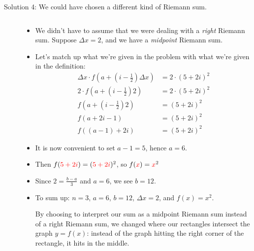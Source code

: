 \begin{solution}
\begin{description}
\item[Solution 4: We could have chosen a different kind of Riemann sum.]
$ $
\begin{itemize}
\item We didn't have to assume that we were dealing with a \emph{right} Riemann sum. Suppose $\Delta x =2$, and we have a \emph{midpoint} Riemann sum.

\item Let's match up what we're given in the problem with what we're given in the definition:
\begin{align*}
\Delta x \cdot f\left(a+\left(i-\tfrac{1}{2}\right)\Delta x\right)&=2\cdot\left(5+2i\right)^2\\
2 \cdot f\left(a+\left(i-\tfrac{1}{2}\right)2\right)&=2\cdot\left(5+2i\right)^2\\
f\left(a+\left(i-\tfrac{1}{2}\right)2\right)&=\left(5+2i\right)^2\\
f\left(a+2i-1\right)&=\left(5+2i\right)^2\\
f\left((a-1)+2i\right)&=\left(5+2i\right)^2
\end{align*}
\item It is now convenient to set $a-1=5$, hence $a=6$.
\item Then $f(\textcolor{red}{5+2i})=(\textcolor{red}{5+2i})^2$, so $f(\textcolor{red}{x})=\textcolor{red}{x}^2$
\item Since $2=\frac{b-a}{3}$ and $a=6$, we see $b=12$.
\item To sum up: $n=3$, $a=6$, $b=12$, $\Delta x = 2$, and $f(x)=x^2$.
\begin{center}
\end{center}
By choosing to interpret our sum as a midpoint Riemann sum instead of a right Riemann sum, we changed where our rectangles intersect the graph $y=f(x)$:  instead of the graph hitting the right corner of the rectangle, it hits in the middle.
\end{itemize}
\end{description}
\end{solution}


